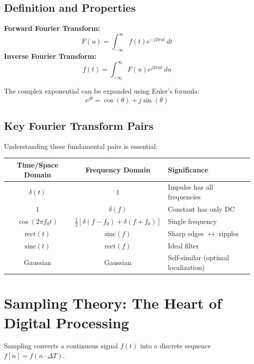 \documentclass[12pt,a4paper]{article}
\begin{document}
\subsection{Definition and Properties}

\begin{mathbox}
\textbf{Forward Fourier Transform:}
\[
F(u) = \int_{-\infty}^{\infty} f(t) e^{-j2\pi ut} \, dt
\]
\textbf{Inverse Fourier Transform:}
\[
f(t) = \int_{-\infty}^{\infty} F(u) e^{j2\pi ut} \, du
\]
\end{mathbox}

The complex exponential can be expanded using Euler's formula:
\[
e^{j\theta} = \cos(\theta) + j\sin(\theta)
\]

\subsection{Key Fourier Transform Pairs}

Understanding these fundamental pairs is essential:

\begin{center}
\begin{tabular}{|c|c|l|}
\hline
\textbf{Time/Space Domain} & \textbf{Frequency Domain} & \textbf{Significance} \\
\hline
$\delta(t)$ & $1$ & Impulse has all frequencies \\
$1$ & $\delta(f)$ & Constant has only DC \\
$\cos(2\pi f_0 t)$ & $\frac{1}{2}[\delta(f-f_0) + \delta(f+f_0)]$ & Single frequency \\
$\text{rect}(t)$ & $\text{sinc}(f)$ & Sharp edges $\leftrightarrow$ ripples \\
$\text{sinc}(t)$ & $\text{rect}(f)$ & Ideal filter \\
Gaussian & Gaussian & Self-similar (optimal localization) \\
\hline
\end{tabular}
\end{center}

\section{Sampling Theory: The Heart of Digital Processing}

Sampling converts a continuous signal $f(t)$ into a discrete sequence $f[n] = f(n \cdot \Delta T)$.
\end{document}
